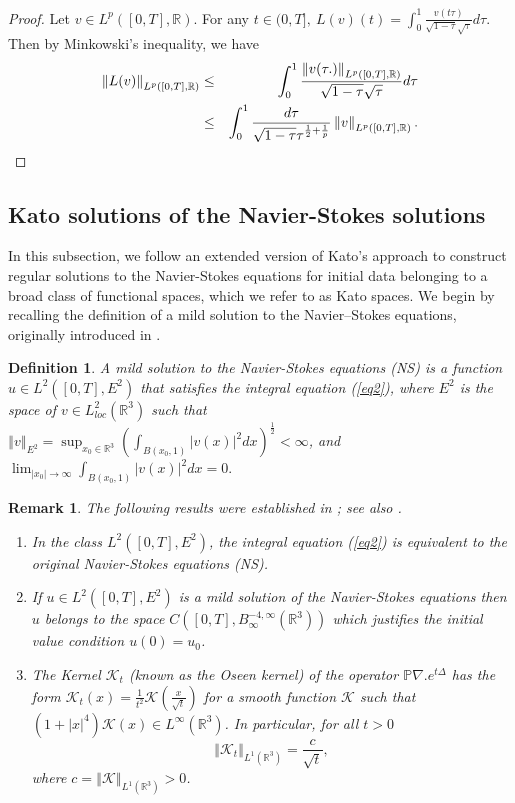 \documentclass[11pt]{amsart}%
\theoremstyle{plain}
\numberwithin{equation}{section}
\newtheorem{definition}{Definition}[section]
\newtheorem{remark}{Remark}[section]
\begin{document}
\begin{proof}
Let $v\in L^{p}([0,T],\mathbb{R}).$ For any $t\in (0,T],~L(v)(t)=\int_{0}^{1}%
\frac{v(t\tau )}{\sqrt{1-\tau }\sqrt{\tau }}d\tau .$ Then by Minkowski's
inequality, we have
\begin{eqnarray*}
\left\Vert L(v)\right\Vert _{L^{p}([0,T],\mathbb{R})} &\leq &\int_{0}^{1}%
\frac{\left\Vert v(\tau .)\right\Vert _{L^{p}([0,T],\mathbb{R})}}{\sqrt{%
1-\tau }\sqrt{\tau }}d\tau \\
&\leq &\int_{0}^{1}\frac{d\tau }{\sqrt{1-\tau }\tau ^{\frac{1}{2}+\frac{1}{p}%
}}\left\Vert v\right\Vert _{L^{p}([0,T],\mathbb{R})}.
\end{eqnarray*}
\end{proof}

\subsection{Kato  solutions of the Navier-Stokes solutions}
In this subsection, we follow an extended version of Kato's approach to construct regular solutions to the Navier-Stokes equations for initial data belonging to a broad class of functional spaces, which we refer to as Kato spaces. We begin by recalling the definition of a mild solution to the Navier--Stokes equations, originally introduced in \cite{FLT2}.
\begin{definition}
A mild solution to the Navier-Stokes equations (NS) is a function $u\in L^2([0,T],E^2)$ that satisfies the integral equation (\ref{eq2}), where $E^2$ is the space of $v\in L^2_{loc}(\mathbb{R}^3)$ such that $\left\Vert v\right\Vert_{E^2} =\sup_{x_0\in\mathbb{R}^3}\left(\int_{B(x_0,1)}\left\vert v(x)\right\vert^2dx\right)^{\frac{1}{2}}<\infty$, and $ \lim_{\left\vert x_0\right\vert\to\infty}\int_{B(x_0,1)}\left\vert v(x)\right\vert^2dx=0.$
\end{definition}
\begin{remark} The following results were established in \cite{FLT2}; see also \cite{Lem2,May}.
    \begin{enumerate}
        \item In the class $L^2([0,T],E^2)$, the integral equation  (\ref{eq2}) is equivalent to the original Navier-Stokes equations (NS).
        \item If $u\in L^2([0,T],E^2)$ is a mild solution of the Navier-Stokes equations then  $u$ belongs to the space  $ C([0,T],B^{-4,\infty}_\infty(\mathbb{R}^3))$ which justifies the initial value condition $u(0)=u_0$.
        \item The Kernel $\mathcal{K}_t$ (known as the Oseen kernel) of the operator $\mathbb{P}\nabla .e^{t\Delta }$ has the form $\mathcal{K}_t(x)=\frac{1}{t^2}\mathcal{K}(\frac{x}{\sqrt{t}})$ for a smooth function $\mathcal{K}$ such that $(1+\left\vert x\right\vert^4)\mathcal{K}(x)\in L^\infty(\mathbb{R}^3)$. In particular, for all $t>0$
        \begin{equation}\label{kernel}
            \left\Vert \mathcal{K}_t\right\Vert_{ L^1(\mathbb{R}^3)}=\frac{c}{\sqrt{t}},
        \end{equation}
        where $c=\left\Vert \mathcal{K}\right\Vert_{ L^1(\mathbb{R}^3)}>0$.
    \end{enumerate}
\end{remark}
\end{document}
